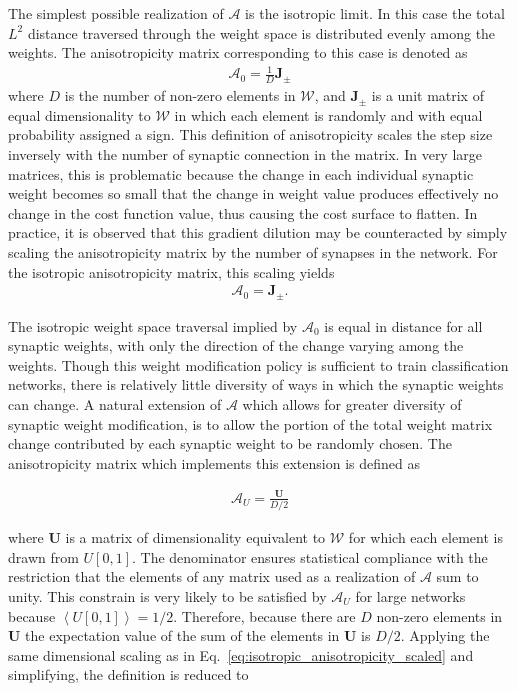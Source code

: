 \documentclass[11pt]{afthesis}
\begin{document}
	The simplest possible realization of $\boldsymbol{\mathcal{A}}$ is the isotropic limit. In this case the total $L^2$ distance traversed through the weight space is distributed evenly among the weights. The anisotropicity matrix corresponding to this case is denoted as
	\begin{align}\label{eq:isotropic_anisotropicity}
	\boldsymbol{\mathcal{A}}_0 = \frac{1}{D}  \boldsymbol{J}_{\pm}
	\end{align}
	\noindent where $D$ is the number of non-zero elements in $\boldsymbol{\mathcal{W}}$, and $\boldsymbol{J}_{\pm}$ is a unit matrix of equal dimensionality to $\boldsymbol{\mathcal{W}}$ in which each element is randomly and with equal probability assigned a sign. This definition of anisotropicity scales the step size inversely with the number of synaptic connection in the matrix. In very large matrices, this is problematic because the change in each individual synaptic weight becomes so small that the change in weight value produces effectively no change in the cost function value, thus causing the cost surface to flatten. In practice, it is observed that this gradient dilution may be counteracted by simply scaling the anisotropicity matrix by the number of synapses in the network. For the isotropic anisotropicity matrix, this scaling yields
	\begin{align}\label{eq:isotropic_anisotropicity_scaled}
	\boldsymbol{\mathcal{A}}_0 =  \boldsymbol{J}_{\pm}.
	\end{align} 
	
	The isotropic weight space traversal implied by $\boldsymbol{\mathcal{A}}_0$ is equal in distance for all synaptic weights, with only the direction of the change varying among the weights. Though this weight modification policy is sufficient to train classification networks, there is relatively little diversity of ways in which the synaptic weights can change. A natural extension of $\boldsymbol{\mathcal{A}}$ which allows for greater diversity of synaptic weight modification, is to allow the portion of the total weight matrix change contributed by each synaptic weight to be randomly chosen. The anisotropicity matrix which implements this extension is defined as
	
	\begin{align}
	\boldsymbol{\mathcal{A}}_U =  \frac{\boldsymbol{U}}{D/2}
	\end{align}
	
	\noindent where $\boldsymbol{U}$ is a matrix of dimensionality equivalent to $\boldsymbol{\mathcal{W}}$ for which each element is drawn from $U[0,1]$.  The denominator ensures statistical compliance with the restriction that the elements of any matrix used as a realization of $\boldsymbol{\mathcal{A}}$ sum to unity. This constrain is very likely to be satisfied by $\boldsymbol{\mathcal{A}}_U$ for large networks because $\left\langle  U[0,1] \right\rangle =1/2$. Therefore, because there are $D$ non-zero elements in $\boldsymbol{U}$ the expectation value of the sum of the elements in $\boldsymbol{U}$ is $D/2$. Applying the same dimensional scaling as in Eq.~\ref{eq:isotropic_anisotropicity_scaled} and simplifying, the definition is reduced to
	
\end{document}
